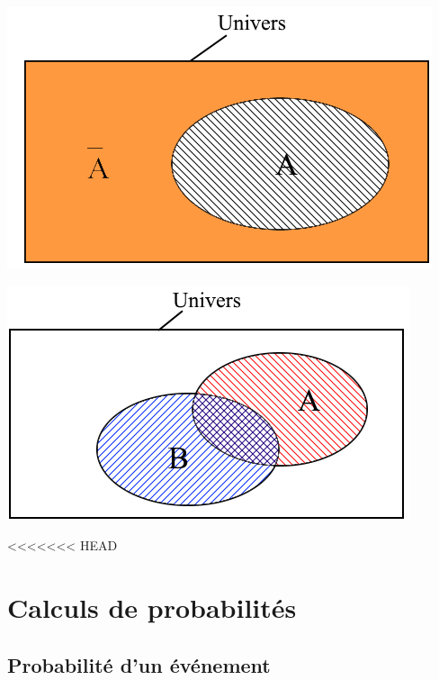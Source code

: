 \documentclass[12pt,a4paper]{article}
\begin{document}
	
	\vspace*{1cm}
	\begin{multicols}{2}
		\begin{center}
			
			\includegraphics[scale=0.40]{./img/contraire}
			\label{fig:contraire}
			
			
			\includegraphics[scale=0.43]{./img/union_inter}
			\label{fig:union}
		\end{center}
		
		
<<<<<<< HEAD
	\end{multicols}	
	
	
			
	\section{Calculs de probabilités}
	
	\subsection{Probabilité d'un événement}		
	
\end{document}
